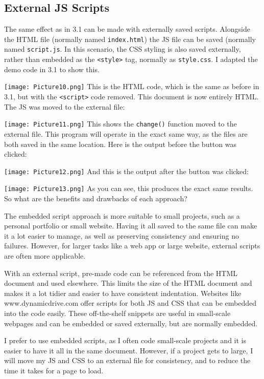 \documentclass[a4paper]{article}
\begin{document}
\subsection{External JS Scripts}
The same effect as in 3.1 can be made with externally saved scripts. Alongside the HTML file (normally named \verb|index.html|) the JS file can be saved (normally named \verb|script.js|. In this scenario, the CSS styling is also saved externally, rather than embedded as the \verb|<style>| tag, normally as \verb|style.css|. I adapted the demo code in 3.1 to show this. \par
\noindent\texttt{[image: Picture10.png]}
This is the HTML code, which is the same as before in 3.1, but with the \verb|<script>| code removed. This document is now entirely HTML. The JS was moved to the external file: \par
\noindent\texttt{[image: Picture11.png]}
This shows the \verb|change()| function moved to the external file. This program will operate in the exact same way, as the files are both saved in the same location. Here is the output before the button was clicked: \par
\noindent\texttt{[image: Picture12.png]} 
And this is the output after the button was clicked: \par
\noindent\texttt{[image: Picture13.png]} 
As you can see, this produces the exact same results. So what are the benefits and drawbacks of each approach? \par \par
The embedded script approach is more suitable to small projects, such as a personal portfolio or small website. Having it all saved to the same file can make it a lot easier to manage, as well as preserving consistency and ensuring no failures. However, for larger tasks like a web app or large website, external scripts are often more applicable. \par
With an external script, pre-made code can be referenced from the HTML document and used elsewhere. This limits the size of the HTML document and makes it a lot tidier and easier to have consistent indentation. Websites like www.dynamicdrive.com offer scripts for both JS and CSS that can be embedded into the code easily. These off-the-shelf snippets are useful in small-scale webpages and can be embedded or saved externally, but are normally embedded. \par
I prefer to use embedded scripts, as I often code small-scale projects and it is easier to have it all in the same document. However, if a project gets to large, I will move my JS and CSS to an external file for consistency, and to reduce the time it takes for a page to load.
\end{document}
